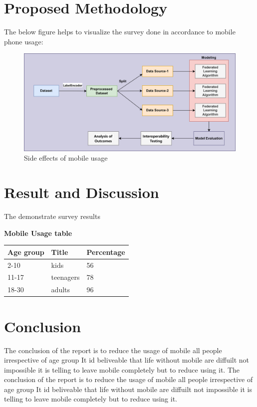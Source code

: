 \documentclass{article}
\begin{document}
	\section{Proposed Methodology}
	The below figure helps to visualize the survey done in accordance to mobile phone usage: 
	\begin{figure}[h]
		\centering
		\includegraphics[width=0.7\linewidth]{Aaa.png}
		\caption{Side effects of mobile usage}
		\label{fig:mobile}
	\end{figure}
	
	\section{Result and Discussion}
	The demonstrate survey results
	\begin{center}
		\textbf{Mobile Usage table}
	\end{center}
	
	
	\begin{center}
		\begin{tabular}{|l|l|l|}
			\hline 
			Age group & Title & Percentage\\ \hline
			\hline 
			2-10 &  kids & 56\\ 
			\hline 
			11-17 & teenagers & 78  \\ 
			\hline 
			18-30 & adults & 96  \\ 
			\hline 
		\end{tabular}
	\end{center}
	
	\section{Conclusion}
	The conclusion of the report is to reduce the usage of mobile all people irrespective of age group It id beliveable that life without mobile are diffuilt not impossible it is telling to leave mobile completely but to reduce using it. The conclusion of the report is to reduce the usage of mobile all people irrespective of age group It id beliveable that life without mobile are diffuilt not impossible it is telling to leave mobile completely but to reduce using it. 
	
	
	
\end{document}
